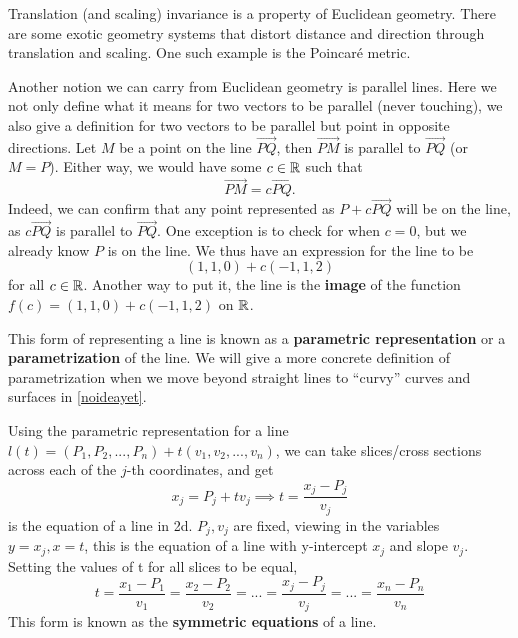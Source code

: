 \begin{remark}
	Translation (and scaling) invariance is a property of Euclidean geometry. There are some exotic geometry systems that distort distance and direction through translation and scaling. One such example is the Poincar\'e metric.
\end{remark}
Another notion we can carry from Euclidean geometry is parallel lines. Here we not only define what it means for two vectors to be parallel (never touching), we also give a definition for two vectors to be parallel but point in opposite directions.
Let $M$ be a point on the line $\overrightarrow{PQ}$, then $\overrightarrow{PM}$ is parallel to $\overrightarrow{PQ}$ (or $M=P$). Either way, we would have some $c\in\mathbb{R}$ such that \[
\overrightarrow{PM}=c\overrightarrow{PQ}.
\]
Indeed, we can confirm that any point represented as $P+c\overrightarrow{PQ}$ will be on the line, as $c\overrightarrow{PQ}$ is parallel to $\overrightarrow{PQ}$. One exception is to check for when $c=0$, but we already know $P$ is on the line.
We thus have an expression for the line to be \[
	(1,1,0) + c(-1,1,2)
\]
for all $c\in\mathbb{R}$. Another way to put it, the line is the \textbf{image} of the function $f(c) = (1,1,0) + c(-1,1,2)$ on $\mathbb{R}$.
\begin{remark}
	This form of representing a line is known as a \textbf{parametric representation} or a \textbf{parametrization} of the line. We will give a more concrete definition of parametrization when we move beyond straight lines to ``curvy'' curves and surfaces in \ref{noideayet}.
\end{remark}
\begin{remark}
	Using the parametric representation for a line $l(t) = (P_1,P_2,...,P_n)+ t(v_1,v_2,...,v_n)$, we can take slices/cross sections across each of the $j$-th coordinates, and get \[
	x_j = P_j+tv_j \implies t = \frac{x_j-P_j}{v_j}
	\] 
	is the equation of a line in 2d. $P_j, v_j$ are fixed, viewing in the variables $y=x_j, x=t$, this is the equation of a line with y-intercept $x_j$ and slope $v_j$. Setting the values of t for all slices to be equal, \[
	t= \frac{x_1-P_1}{v_1}=\frac{x_2-P_2}{v_2}=...=\frac{x_j-P_j}{v_j}=...=\frac{x_n-P_n}{v_n}
	\]
	This form is known as the \textbf{symmetric equations} of a line.
\end{remark}

